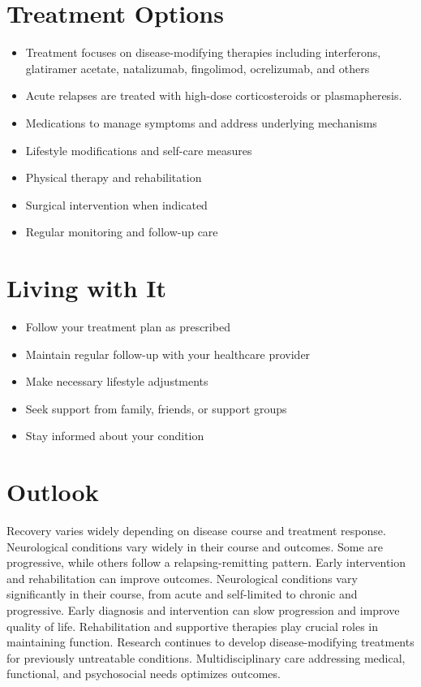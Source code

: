 \section{Treatment Options}
\begin{itemize}[noitemsep]
  \item Treatment focuses on disease-modifying therapies including interferons, glatiramer acetate, natalizumab, fingolimod, ocrelizumab, and others
  \item Acute relapses are treated with high-dose corticosteroids or plasmapheresis.
  \item Medications to manage symptoms and address underlying mechanisms
  \item Lifestyle modifications and self-care measures
  \item Physical therapy and rehabilitation
  \item Surgical intervention when indicated
  \item Regular monitoring and follow-up care
\end{itemize}
\section{Living with It}
\begin{itemize}[noitemsep]
  \item Follow your treatment plan as prescribed
  \item Maintain regular follow-up with your healthcare provider
  \item Make necessary lifestyle adjustments
  \item Seek support from family, friends, or support groups
  \item Stay informed about your condition
\end{itemize}
\section{Outlook}
Recovery varies widely depending on disease course and treatment response. Neurological conditions vary widely in their course and outcomes. Some are progressive, while others follow a relapsing-remitting pattern. Early intervention and rehabilitation can improve outcomes. Neurological conditions vary significantly in their course, from acute and self-limited to chronic and progressive. Early diagnosis and intervention can slow progression and improve quality of life. Rehabilitation and supportive therapies play crucial roles in maintaining function. Research continues to develop disease-modifying treatments for previously untreatable conditions. Multidisciplinary care addressing medical, functional, and psychosocial needs optimizes outcomes.

